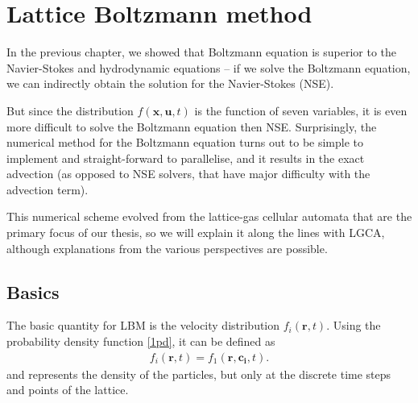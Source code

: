 \chapter{Lattice Boltzmann method}

In the previous chapter, we showed that Boltzmann equation is superior to the Navier-Stokes and hydrodynamic equations -- if we solve the Boltzmann equation, we can indirectly obtain the solution for the Navier-Stokes (NSE).

But since the distribution $f(\bm{x},\bm{u},t)$ is the function of seven variables, it is even more difficult to solve the Boltzmann equation then NSE. 
Surprisingly, the numerical method for the Boltzmann equation turns out to be simple to implement and straight-forward to parallelise, and it results in the exact advection (as opposed to NSE solvers, that have major difficulty with the advection term). 

This numerical scheme evolved from the lattice-gas cellular automata that are the primary focus of our thesis, so we will explain it along the lines with LGCA, although explanations from the various perspectives are possible.


%
\section{Basics}
The basic quantity for LBM is the velocity distribution $f_i(\bm{r},t)$.
Using the probability density function \ref{1pd}, it can be defined as
\begin{align*}
f_i(\bm{r},t) = f_1(\bm{r}, \bm{c_i}, t).
\end{align*}
and represents the density of the particles, but only at the discrete time steps and points of the lattice.

